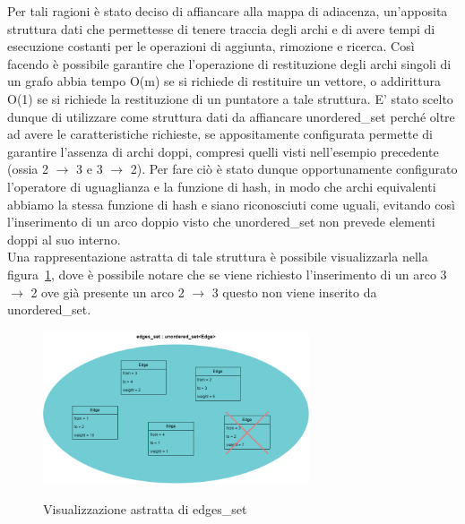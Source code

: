 Per tali ragioni è stato deciso di affiancare alla mappa di adiacenza, un'apposita struttura dati che permettesse di tenere traccia degli archi e di avere tempi di esecuzione costanti per le operazioni di aggiunta, rimozione e ricerca. Così facendo è possibile garantire che l'operazione di restituzione degli archi singoli di un grafo abbia tempo O(m) se si richiede di restituire un vettore, o addirittura O(1) se si richiede la restituzione di un puntatore a tale struttura.
E' stato scelto dunque di utilizzare come struttura dati da affiancare unordered\_set perché oltre ad avere le caratteristiche richieste, se appositamente configurata permette di garantire l'assenza di archi doppi, compresi quelli visti nell'esempio precedente (ossia 2 $\rightarrow$ 3 e 3 $\rightarrow$ 2). Per fare ciò è stato dunque opportunamente configurato l'operatore di uguaglianza e la funzione di hash, in  modo che archi equivalenti abbiamo la stessa funzione di hash e siano riconosciuti come uguali, evitando così l'inserimento di un arco doppio visto che  unordered\_set non prevede elementi doppi al suo interno.\\

Una rappresentazione astratta di tale struttura è possibile visualizzarla nella figura~\ref{fig:edges_set}, dove è possibile notare che se viene richiesto l'inserimento di un arco 3 $\rightarrow$ 2 ove già presente un arco 2 $\rightarrow$ 3 questo non viene inserito da unordered\_set.\\

\begin{figure}[h]
	\caption{Visualizzazione astratta di edges\_set}
	\centering
	\includegraphics[width=0.7\textwidth]{./images/edges_setAbstract.png}
	\label{fig:edges_set}
\end{figure}


